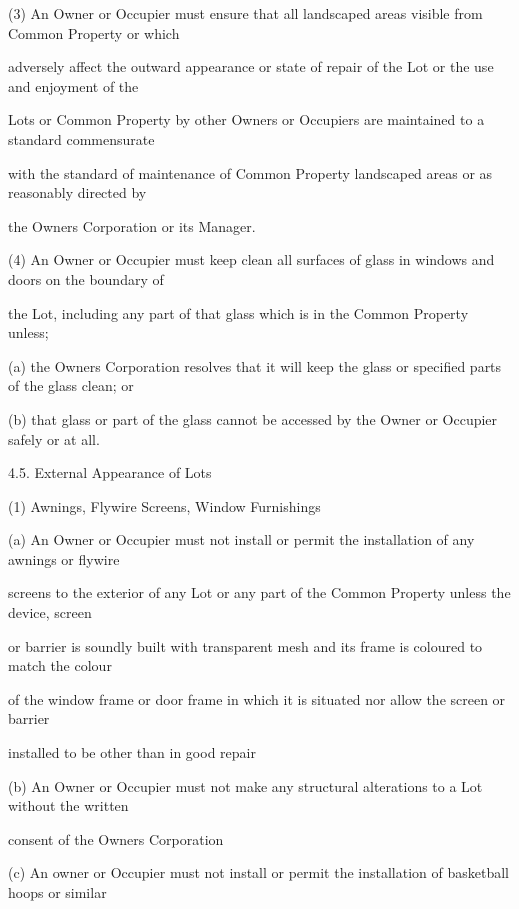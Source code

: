 \documentclass{article}
\begin{document}
{\fontsize{9.962}{1}(3) An Owner or Occupier must ensure that all landscaped areas visible from Common Property or which }

{\fontsize{10.02}{1}adversely affect the outward appearance or state of repair of the Lot or the use and enjoyment of the }

{\fontsize{10.02}{1}Lots or Common Property by other Owners or Occupiers are maintained to a standard commensurate }

{\fontsize{10.02}{1}with the standard of maintenance of Common Property landscaped areas or as reasonably directed by }

{\fontsize{10.02}{1}the Owners Corporation or its Manager. }

{\fontsize{9.962}{1}(4) An Owner or Occupier must keep clean all surfaces of glass in windows and doors on the boundary of }

{\fontsize{10.02}{1}the Lot, including any part of that glass which is in the Common Property unless; }

{\fontsize{9.962}{1}(a) the Owners Corporation resolves that it will keep the glass or specified parts of the glass clean; or }

{\fontsize{9.962}{1}(b) that glass or part of the glass cannot be accessed by the Owner or Occupier safely or at all. }

{\fontsize{9.99}{1}4.5. External Appearance of Lots }

{\fontsize{9.962}{1}(1) Awnings, Flywire Screens, Window Furnishings }

{\fontsize{9.962}{1}(a) An Owner or Occupier must not install or permit the installation of any awnings or flywire }

{\fontsize{10.02}{1}screens to the exterior of any Lot or any part of the Common Property unless the device, screen }

{\fontsize{10.02}{1}or barrier is soundly built with transparent mesh and its frame is coloured to match the colour }

{\fontsize{10.02}{1}of the window frame or door frame in which it is situated nor allow the screen or barrier }

{\fontsize{10.02}{1}installed to be other than in good repair }

{\fontsize{9.962}{1}(b) An Owner or Occupier must not make any structural alterations to a Lot without the written }

{\fontsize{10.02}{1}consent of the Owners Corporation }

{\fontsize{9.962}{1}(c) An owner or Occupier must not install or permit the installation of basketball hoops or similar }
\end{document}
